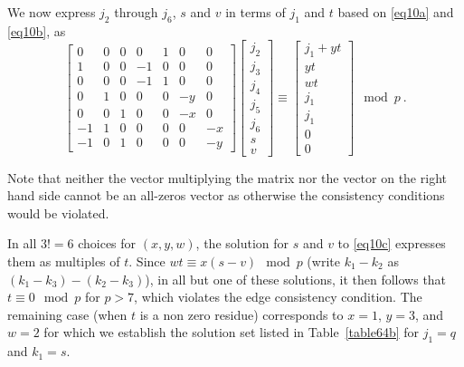 We now express $j_2$ through $j_6$, $s$ and $v$ in terms of $j_1$
and $t$ based on \eqref{eq10a} and \eqref{eq10b}, as
\begin{equation}\label{eq10c}
\left[ \begin{array}{ccccccc} 0 & 0 & 0 & 0 & 1 & 0 &0\\
1 & 0 & 0 & -1 & 0 & 0 &0\\
0 & 0 & 0 & -1 & 1 & 0 &0\\
0 & 1 & 0 & 0 & 0 & -y &0\\
0 & 0 & 1 & 0 & 0 & -x &0\\
-1 & 1 & 0 & 0 & 0 & 0 &-x\\
-1 & 0 & 1 & 0 & 0 & 0 &-y
\end{array}\right] \left[\begin{array}{c}
j_2\\j_3\\j_4\\j_5\\j_6\\s\\v\end{array}\right] \equiv
\left[\begin{array}{c}j_1+yt\\yt\\wt\\j_1\\j_1\\0\\0\end{array}\right]
\mod p~.
\end{equation}

Note that neither the vector multiplying the matrix nor the vector
on the right hand side cannot be an all-zeros vector as otherwise
the consistency conditions would be violated.

In all $3!=6$ choices for $(x,y,w)$, the solution for $s$ and $v$
to \eqref{eq10c} expresses them as multiples of $t$. Since $wt
\equiv x(s-v) \mod p$ (write $k_1-k_2$ as $(k_1-k_3)-(k_2-k_3)$),
in all but one of these solutions, it then follows that $t \equiv
0 \mod p$ for $p>7$, which violates the edge consistency
condition. The remaining case (when $t$ is a non zero residue)
corresponds to $x=1$, $y=3$, and $w=2$ for which we establish the
solution set listed in Table~\ref{table64b} for $j_1=q$ and
$k_1=s$.

